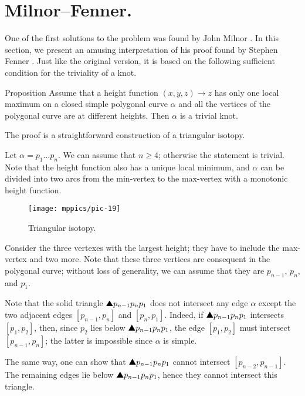\section{Milnor--Fenner.}

One of the first solutions to the problem was found by John Milnor \cite{milnor}.
In this section, we present an amusing interpretation of his proof found by Stephen Fenner \cite{ferner}.
Just like the original version, it is based on the following sufficient condition for the triviality of a knot.

\begin{thm}{Proposition}\label{prop:one-max-one-min}
Assume that a height function $(x,y,z)\to z$ 
has only one local maximum on a closed simple polygonal curve $\alpha$ and all the vertices of the polygonal curve are at different heights.
Then $\alpha$ is a trivial knot.
\end{thm}

The proof is a straightforward construction of a triangular isotopy. 

Let $\alpha=p_1\dots p_n$.
We can assume that $n\ge 4$; otherwise the statement is trivial.
Note that the height function also has a unique local minimum, and $\alpha$ can be divided into two arcs from the min-vertex to the max-vertex with a monotonic height function.

{

\begin{wrapfigure}{r}{30 mm}
\vskip-6mm
\centering
\texttt{[image: mppics/pic-19]}
\caption*{Triangular isotopy.}
\vskip0mm
\end{wrapfigure}

Consider the three vertexes with the largest height;
they have to include the max-vertex and two more.
Note that these three vertices are consequent in the polygonal curve; 
without loss of generality, we can assume that they are $p_{n-1}$, $p_n$, and $p_1$.

Note that the solid triangle $\solidtriangle p_{n-1}p_np_1$ does not intersect any edge $\alpha$ except the two adjacent edges $[p_{n-1},p_n]$ and $[p_n,p_1]$.
Indeed, if $\solidtriangle p_{n-1}p_np_1$ intersects $[p_1,p_2]$,
then, 
since $p_2$ lies below $\solidtriangle p_{n-1}p_np_1$,
the edge $[p_1,p_2]$ must intersect $[p_{n-1},p_n]$;
the latter is impossible since $\alpha$ is simple.

}

The same way, one can show that $\solidtriangle p_{n-1}p_np_1$ cannot intersect $[p_{n-2},p_{n-1}]$.
The remaining edges lie below $\solidtriangle p_{n-1}p_np_1$, hence they cannot intersect this triangle.

